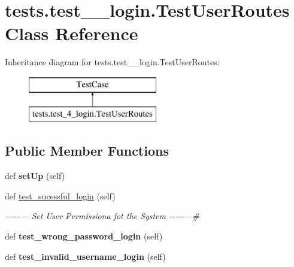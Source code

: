 \hypertarget{classtests_1_1test__4__login_1_1_test_user_routes}{}\section{tests.\+test\+\_\+\_\+login.\+Test\+User\+Routes Class Reference}
\label{classtests_1_1test__4__login_1_1_test_user_routes}
Inheritance diagram for tests.\+test\+\_\+\_\+login.\+Test\+User\+Routes\+:\begin{figure}[H]
\begin{center}
\leavevmode
\includegraphics[height=2.000000cm]{classtests_1_1test__4__login_1_1_test_user_routes}
\end{center}
\end{figure}
\subsection*{Public Member Functions}
\begin{DoxyCompactItemize}
\item 
\mbox{\label{classtests_1_1test__4__login_1_1_test_user_routes_a7106c7acb80baac2e2e4b83cef7df6b0}} 
def {\bfseries set\+Up} (self)
\item 
\mbox{\label{classtests_1_1test__4__login_1_1_test_user_routes_a7acac7d6199d077074c28da30a5b1d1d}} 
def \hyperlink{classtests_1_1test__4__login_1_1_test_user_routes_a7acac7d6199d077074c28da30a5b1d1d}{test\+\_\+sucessful\+\_\+login} (self)
\begin{DoxyCompactList}\small\item\em -\/-\/-\/-\/-\/--- Set User Permissiona fot the System -\/-\/-\/-\/-\/---\# \end{DoxyCompactList}\item 
\mbox{\label{classtests_1_1test__4__login_1_1_test_user_routes_ac5412aba5f3ec6a3099688826f5d8e8d}} 
def {\bfseries test\+\_\+wrong\+\_\+password\+\_\+login} (self)
\item 
\mbox{\label{classtests_1_1test__4__login_1_1_test_user_routes_a01559d5c38a7c74d5a1779fb539fada4}} 
def {\bfseries test\+\_\+invalid\+\_\+username\+\_\+login} (self)
\end{DoxyCompactItemize}
